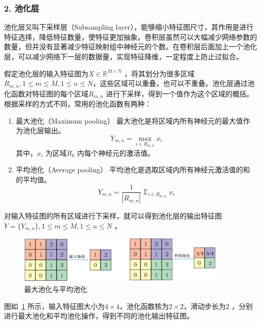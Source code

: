 \subsubsection*{2. 池化层}
\label{subsec:chap02-2-1-2}
池化层又叫下采样层（Subsampling layer），能够缩小特征图尺寸，其作用是进行特征选择，降低特征数量，使特征更加抽象。卷积层虽然可以大幅减少网络参数的数量，但并没有显著减少特征映射组中神经元的个数。在卷积层后面加上一个池化层，可以减少网络下一层的数据量，实现特征降维，一定程度上防止过拟合。

假定池化层的输入特征图为$X \in \mathbb{R}^{M \times N}$ ，将其划分为很多区域$R_{m,n},1 \leq m \leq M, 1 \leq n \leq N$，这些区域可以重叠，也可以不重叠。池化层通过池化函数对特征图的每个区域$R_{m,n}$ 进行下采样，得到一个值作为这个区域的概括。根据采样的方式不同，常用的池化函数有两种：
\begin{enumerate}[1. ]
  \label{list:1}
  \item 最大池化（Maximum pooling）
        最大池化是将区域内所有神经元的最大值作为池化层输出。
        \begin{equation}
          \label{eq:2-18}
          Y_{m,n} = \mathop{\max}_{i \in R_{m,n}} x_i
        \end{equation}
        其中，$x_i$ 为区域$R_k$ 内每个神经元的激活值。

  \item 平均池化（Average pooling）
        平均池化是选取区域内所有神经元激活值的和的平均值。
        \begin{equation}
          \label{eq:2-19}
          Y_{m,n} =  \frac{1}{|R_{m,n}|}\mathbb{\sum}_{i \in R_{m,n}} x_i
        \end{equation}
\end{enumerate}
对输入特征图的所有区域进行下采样，就可以得到池化层的输出特征图$Y = \{ Y_{m,n}\},1 \leq m \leq M, 1 \leq n \leq N$ 。

\begin{figure}[htbp]
  \centering
  \includegraphics[width=0.9\textwidth]{figures/pooling}
  \caption{最大池化与平均池化}\label{fig:pooling}
\end{figure}

图如~\ref{fig:pooling} 所示，输入特征图大小为$4 \times 4$，池化函数核为$2 \times 2$，滑动步长为$2$ ，分别进行最大池化和平均池化操作，得到不同的池化输出特征图。

